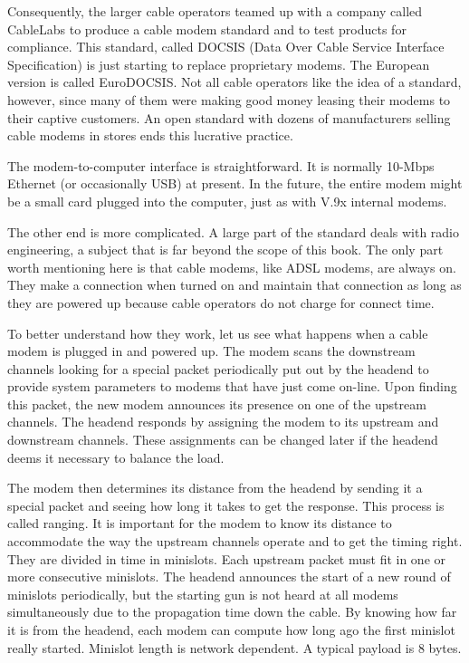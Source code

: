 \documentclass[b5paper,11pt]{memoir}
\begin{document}
Consequently, the larger cable operators teamed up with a company called
CableLabs to produce a cable modem standard and to test products for
compliance. This standard, called {DOCSIS} ({Data Over Cable Service
Interface Specification}) is just starting to replace proprietary
modems. The European version is called {EuroDOCSIS}. Not all cable
operators like the idea of a standard, however, since many of them were
making good money leasing their modems to their captive customers. An
open standard with dozens of manufacturers selling cable modems in
stores ends this lucrative practice.

The modem-to-computer interface is straightforward. It is normally
10-Mbps Ethernet (or occasionally USB) at present. In the future, the
entire modem might be a small card plugged into the computer, just as
with V.9x internal modems.

The other end is more complicated. A large part of the standard deals
with radio engineering, a subject that is far beyond the scope of this
book. The only part worth mentioning here is that cable modems, like
ADSL modems, are always on. They make a connection when turned on and
maintain that connection as long as they are powered up because cable
operators do not charge for connect time.

To better understand how they work, let us see what happens when a cable
modem is plugged in and powered up. The modem scans the downstream
channels looking for a special packet periodically put out by the
headend to provide system parameters to modems that have just come
on-line. Upon finding this packet, the new modem announces its presence
on one of the upstream channels. The headend responds by assigning the
modem to its upstream and downstream channels. These assignments can be
changed later if the headend deems it necessary to balance the load.

The modem then determines its distance from the headend by sending it a
special packet and seeing how long it takes to get the response. This
process is called {ranging}. It is important for the modem to know its
distance to accommodate the way the upstream channels operate and to get
the timing right. They are divided in time in {minislots}. Each upstream
packet must fit in one or more consecutive minislots. The headend
announces the start of a new round of minislots periodically, but the
starting gun is not heard at all modems simultaneously due to the
propagation time down the cable. By knowing how far it is from the
headend, each modem can compute how long ago the first minislot really
started. Minislot length is network dependent. A typical payload is 8
bytes.
\end{document}
